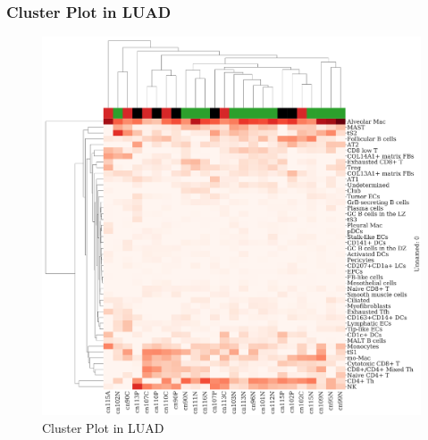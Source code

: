 \documentclass{beamer}
\begin{document}
    \begin{frame}
        \frametitle{Cluster Plot in LUAD}

        \begin{figure}
            \includegraphics[height=0.6 \textheight]{figures/BisqueRNA/clustermap/STAR.ADC.cluster.pdf}
            \caption{Cluster Plot in LUAD}
        \end{figure}
    \end{frame}
\end{document}
